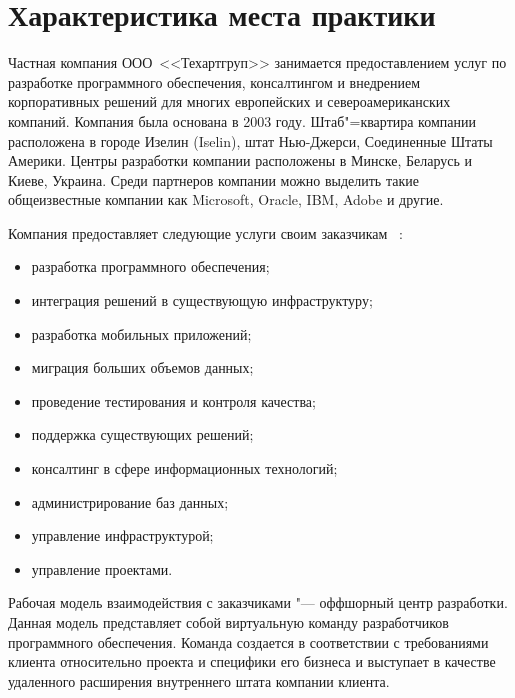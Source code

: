 \section{Характеристика места практики}
\label{sec:practice:itechart_characteristics}
\newcommand{\company}{\mbox{<<Техартгруп>>}}

Частная компания ООО~\company{} занимается предоставлением услуг по разработке программного обеспечения, консалтингом и внедрением корпоративных решений для многих европейских и североамериканских компаний.
Компания была основана в 2003 году.
Штаб"=квартира компании расположена в городе Изелин (Iselin), штат Нью-Джерси, Соединенные Штаты Америки.
Центры разработки компании расположены в Минске, Беларусь и Киеве, Украина.
Среди партнеров компании можно выделить такие общеизвестные компании как Microsoft, Oracle, IBM, Adobe и другие.

Компания предоставляет следующие услуги своим заказчикам~
\cite{itechart_2013}:
\begin{itemize}
  \item разработка программного обеспечения;
  \item интеграция решений в существующую инфраструктуру;
  \item разработка мобильных приложений;
  \item миграция больших объемов данных;
  \item проведение тестирования и контроля качества;
  \item поддержка существующих решений;
  \item консалтинг в сфере информационных технологий;
  \item администрирование баз данных;
  \item управление инфраструктурой;
  \item управление проектами.
\end{itemize}

Рабочая модель взаимодействия с заказчиками "--- оффшорный центр разработки.
Данная модель представляет собой виртуальную команду разработчиков программного обеспечения.
Команда создается в соответствии с требованиями клиента относительно проекта и специфики его бизнеса и выступает в качестве удаленного расширения внутреннего штата компании клиента.

